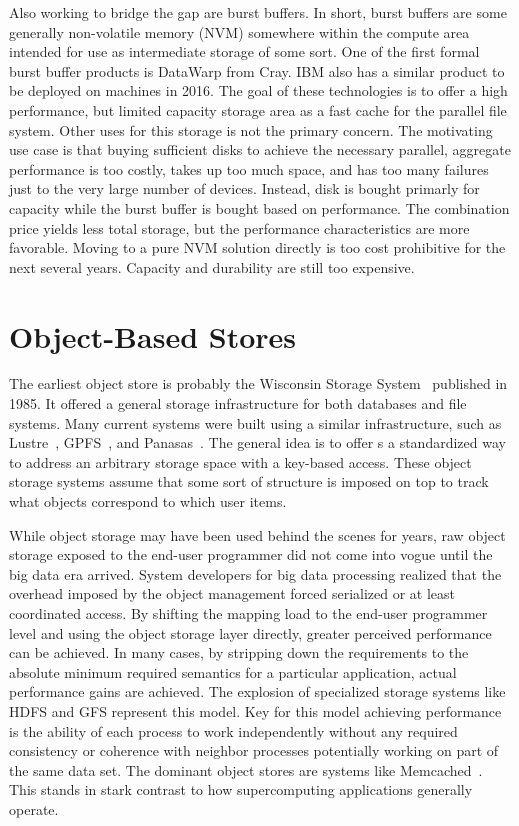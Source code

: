 Also working to bridge the gap are burst buffers. In short, burst buffers are
some generally non-volatile memory (NVM) somewhere within the compute area
intended for use as intermediate storage of some sort.  One of the first formal
burst buffer products is DataWarp from Cray. IBM also has a similar product to
be deployed on machines in 2016. The goal of these technologies is to offer a
high performance, but limited capacity storage area as a fast cache for the
parallel file system. Other uses for this storage is not the primary concern.
The motivating use case is that buying sufficient disks to achieve the
necessary parallel, aggregate performance is too costly, takes up too much
space, and has too many failures just to the very large number of devices.
Instead, disk is bought primarly for capacity while the burst buffer is bought
based on performance. The combination price yields less total storage, but the
performance characteristics are more favorable. Moving to a pure NVM solution
directly is too cost prohibitive for the next several years. Capacity and
durability are still too expensive.

\section{Object-Based Stores}\label{sec:intro}

The earliest object store is probably the Wisconsin Storage
System~\cite{1985:chou:wisconsin-storage} published in 1985. It offered a
general storage infrastructure for both databases and file systems. Many
current systems were built using a similar infrastructure, such as
Lustre~\cite{braam:2002:lustre-arch}, GPFS~\cite{schmuck:2002:gpfs}, and
Panasas~\cite{welch:2008:panasas}. The general idea is to offer s a
standardized way to address an arbitrary storage space with a key-based access.
These object storage systems assume that some sort of structure is imposed on
top to track what objects correspond to which user items.

While object storage may have been used behind the scenes for years, raw
object storage exposed to the end-user programmer did not come into vogue until
the big data era arrived. System developers for big data processing realized
that the overhead imposed by the object management forced serialized or at
least coordinated access. By shifting the mapping load to the end-user
programmer level and using the object storage layer directly, greater perceived
performance can be achieved. In many cases, by stripping down the requirements
to the absolute minimum required semantics for a particular application,
actual performance gains are achieved. The explosion of specialized storage
systems like HDFS and GFS represent this model. Key for this model achieving
performance is the ability of each process to work independently without any
required consistency or coherence with neighbor processes potentially working
on part of the same data set. The dominant object stores are systems like
Memcached~\cite{fitzpatrick:2004:memcached}. This stands in stark contrast to
how supercomputing applications generally operate.

